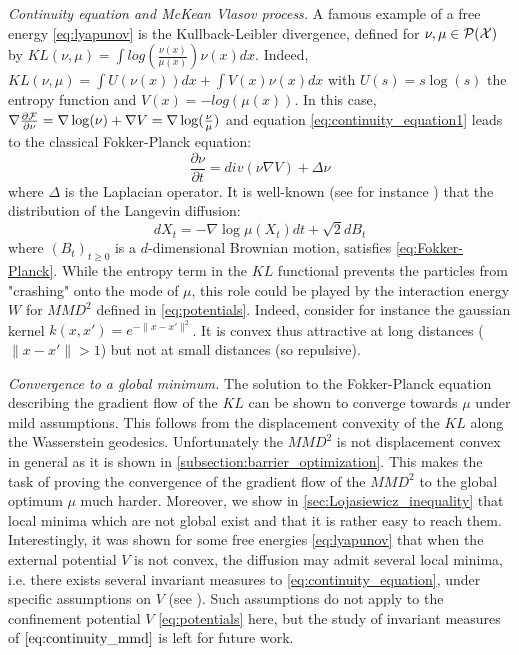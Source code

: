 \textit{Continuity equation and McKean Vlasov process.}	A famous example of a free energy \eqref{eq:lyapunov} is the Kullback-Leibler divergence, defined for $\nu, \mu \in \mathcal{P}({{\mathcal X}})$ by
	$KL(\nu,\mu)=\int log(\frac{\nu(x)}{\mu(x)})\nu(x)dx$. Indeed, $KL(\nu, \mu)=\int U(\nu(x))dx + \int V(x) \nu(x)dx$ with $U(s)=s\log(s)$ the entropy function and $V(x)=-log(\mu(x))$. In this case, $\nabla \frac{\partial {{\mathcal F}}}{\partial \nu}= \nabla \log(\nu) + \nabla V=  \nabla \log(\frac{\nu}{\mu})$ and equation \eqref{eq:continuity_equation1} leads to the classical Fokker-Planck equation:
	\begin{equation}\label{eq:Fokker-Planck}
	\frac{\partial{\nu}}{\partial t}= div(\nu \nabla V )+ \Delta \nu
	\end{equation}
	where $\Delta$ is the Laplacian operator. It is well-known (see for instance \cite{jordan1998variational}) that the distribution of the Langevin diffusion:
	\begin{equation}\label{eq:langevin_diffusion}
	dX_t= -\nabla \log \mu (X_t)dt+\sqrt{2}dB_t
	\end{equation}
	where $(B_t)_{t\ge0}$ is a $d$-dimensional Brownian motion, satisfies \eqref{eq:Fokker-Planck}. While the entropy term in the $KL$ functional prevents the particles from "crashing" onto the mode of $\mu$, this role could be played by the interaction energy $W$ for $MMD^2$ defined in \cref{eq:potentials}. Indeed, consider for instance the gaussian kernel $k(x,x')=e^{-\|x-x'\|^2}$. It is convex thus attractive at long distances ($\|x-x'\|>1$) but not at small distances (so repulsive). %
	
	
\textit{Convergence to a global minimum.} The solution to the Fokker-Planck equation describing the gradient flow of the $KL$ can be shown to converge towards $\mu$ under mild assumptions. This follows from the displacement convexity of the $KL$ along the Wasserstein geodesics. Unfortunately the $MMD^2$ is not displacement convex in general as it is shown in \cref{subsection:barrier_optimization}. This makes the task of proving the convergence of the gradient flow of the $MMD^2$ to the global optimum $\mu$ much harder. Moreover, we show in \cref{sec:Lojasiewicz_inequality} that local minima which are not global exist and that it is rather easy to reach them. Interestingly, it was shown for some free energies \eqref{eq:lyapunov} that when the external potential $V$ is not convex, the diffusion may admit several local minima, i.e. there exists several invariant measures to \eqref{eq:continuity_equation}, under specific assumptions on $V$ (see \cite{herrmann2010non,tugaut2014phase}). Such assumptions do not apply to the confinement potential $V$ \eqref{eq:potentials} here, but the study of invariant measures of $\eqref{eq:continuity_mmd}$ is left for future work.

